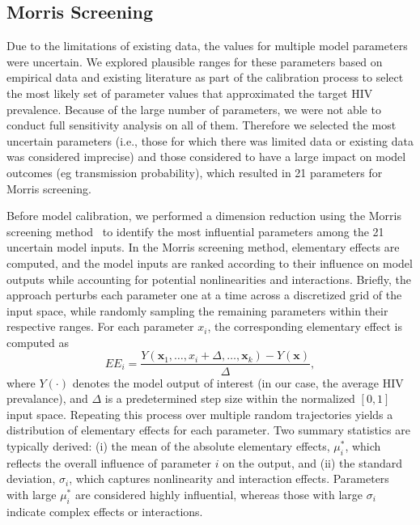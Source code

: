 \documentclass[preprint,12pt]{elsarticle}
\begin{document}
\subsection{Morris Screening} 

Due to the limitations of existing data, the values for multiple model parameters were uncertain. We explored plausible ranges for these parameters based on empirical data and existing literature as part of the calibration process to select the most likely set of parameter values that approximated the target HIV prevalence. Because of the large number of parameters, we were not able to conduct full sensitivity analysis on all of them. Therefore we selected the most uncertain parameters (i.e., those for which there was limited data or existing data was considered imprecise) and those considered to have a large impact on model outcomes (eg transmission probability), which resulted in 21 parameters for Morris screening.

Before model calibration, we performed a dimension reduction using the Morris screening method~\cite{morris1991factorial, campolongo2007effective} to identify the most influential parameters among the 21 uncertain model inputs. In the Morris screening method, elementary effects are computed, and the model inputs are ranked according to their influence on model outputs while accounting for potential nonlinearities and interactions. Briefly, the approach perturbs each parameter one at a time across a discretized grid of the input space, while randomly sampling the remaining parameters within their respective ranges. For each parameter \(x_i\), the corresponding elementary effect is computed as
\begin{equation}
    EE_i = \frac{Y(\mathbf{x}_{1}, \ldots, x_i + \Delta, \ldots, \mathbf{x}_{k}) - Y(\mathbf{x})}{\Delta},
\end{equation}
where \(Y(\cdot)\) denotes the model output of interest (in our case, the average HIV prevalance), and \(\Delta\) is a predetermined step size within the normalized \([0,1]\) input space. Repeating this process over multiple random trajectories yields a distribution of elementary effects for each parameter. Two summary statistics are typically derived: (i) the mean of the absolute elementary effects, \(\mu^*_i\), which reflects the overall influence of parameter \(i\) on the output, and (ii) the standard deviation, \(\sigma_i\), which captures nonlinearity and interaction effects. Parameters with large \(\mu^*_i\) are considered highly influential, whereas those with large \(\sigma_i\) indicate complex effects or interactions.
\end{document}
